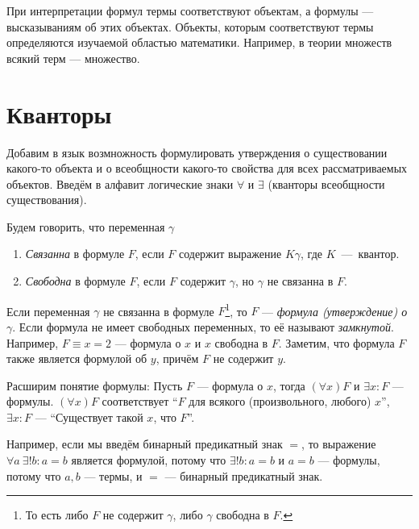 При интерпретации формул термы соответствуют объектам, а формулы --- высказываниям
об этих объектах. Объекты, которым соответствуют термы определяются изучаемой
областью математики. Например, в теории множеств всякий терм --- множество.

\section{Кванторы}

Добавим в язык возмножность формулировать утверждения о существовании
какого-то объекта и о всеобщности какого-то свойства для всех рассматриваемых объектов.
Введём в алфавит логические знаки $\forall$ и $\exists$
(кванторы всеобщности существования).

\pagebreak

Будем говорить, что переменная $\gamma$
\begin{multicols}{2}
	\begin{enumerate}
		\item{}{\it Связанна} в формуле $F$, если $F$ содержит
			выражение $K\gamma$, где $K$~---~квантор.
			\columnbreak
		\item{}{\it Свободна} в формуле $F$, если $F$ содержит $\gamma$,
			но $\gamma$ не связанна в $F$.
	\end{enumerate}
\end{multicols}

Если переменная $\gamma$
не связанна в формуле $F$\footnote{
	То есть либо $F$ не содержит $\gamma$, либо $\gamma$ свободна в $F$.},
то $F$ --- {\it формула (утверждение) о} $\gamma$. Если формула не имеет
свободных переменных, то её называют {\it замкнутой}.
Например, $F\equiv x=2$ --- формула о $x$ и $x$ свободна в $F$.
Заметим, что формула $F$ также является формулой об $y$, причём $F$ не содержит $y$.

Расширим понятие формулы: Пусть $F$ --- формула о $x$, тогда ${(\forall x)F}$
и ${\exists x:F}$ --- формулы. $(\forall x)F$ соответствует
``$F$ для всякого (произвольного, любого) $x$'', $\exists x:F$ ---
``Существует такой $x$, что $F$''.

Например, если мы введём бинарный предикатный знак $=$, то выражение
$\forall a~\exists!b:a=b$ является формулой, потому что ${\exists! b:a=b}$ и
${a=b}$ --- формулы, потому что $a,b$ --- термы, и $=$ --- бинарный предикатный знак.

